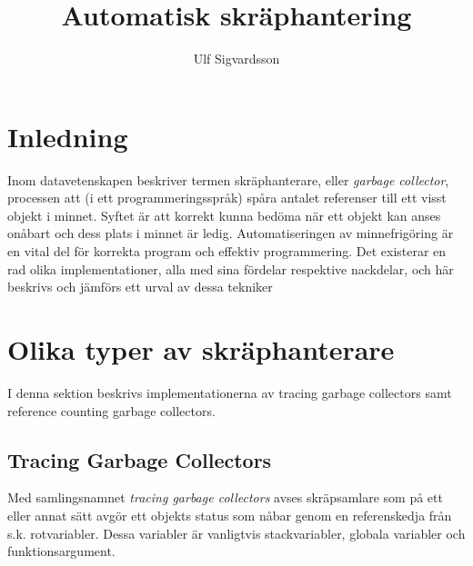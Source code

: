 \documentclass{article}
\title{Automatisk skräphantering}
\author{Ulf Sigvardsson}
\begin{document}
\maketitle
\newpage
\tableofcontents
\newpage
\section{Inledning}
Inom datavetenskapen beskriver termen skräphanterare, eller \textit{garbage collector}, processen att (i ett programmeringsspråk) spåra antalet referenser till ett visst objekt i minnet. Syftet är att korrekt kunna bedöma när ett objekt kan anses onåbart och dess plats i minnet är ledig. Automatiseringen av minnefrigöring är en vital del för korrekta program och effektiv programmering. Det existerar en rad olika implementationer, alla med sina fördelar respektive nackdelar, och här beskrivs och jämförs ett urval av dessa tekniker

\section{Olika typer av skräphanterare}
I denna sektion beskrivs implementationerna av tracing garbage collectors samt reference counting garbage collectors.
\subsection{Tracing Garbage Collectors}
Med samlingsnamnet \textit{tracing garbage collectors} avses skräpsamlare som på ett eller annat sätt avgör ett objekts status som nåbar genom en referenskedja från s.k. rotvariabler. Dessa variabler är vanligtvis stackvariabler, globala variabler och funktionsargument.
\end{document}
